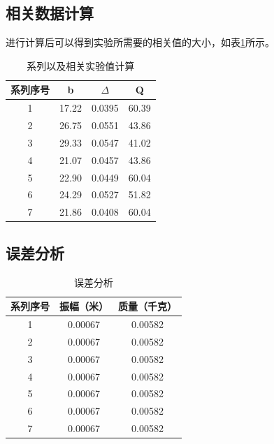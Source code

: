 \documentclass{ctexart}
\begin{document}
  \subsection{相关数据计算}
  进行计算后可以得到实验所需要的相关值的大小，如表\ref{jisuan}所示。

  \begin{table}[H]
    \centering   
    \caption{系列以及相关实验值计算}\label{jisuan}
    \begin{tabular}{| c || c || c || c |}
        \hline
        系列序号 & b & $\Delta$ & Q\\
        \hline
        1 & 17.22 & 0.0395 & 60.39\\
        \hline
        2 & 26.75 & 0.0551 & 43.86\\
        \hline
        3 & 29.33 & 0.0547 & 41.02\\
        \hline
        4 & 21.07 & 0.0457 & 43.86\\
        \hline
        5 & 22.90 & 0.0449 & 60.04\\
        \hline   
        6 & 24.29 & 0.0527 & 51.82\\
        \hline
        7 & 21.86 & 0.0408 & 60.04\\
        \hline                             
    \end{tabular}
  \end{table}

  \subsection{误差分析}
  \begin{table}[H]
    \centering   
    \caption{误差分析}
    \begin{tabular}{| c || c || c |}
        \hline
        系列序号 & 振幅（米） & 质量（千克）\\
        \hline
        1 & 0.00067 & 0.00582\\
        \hline
        2 & 0.00067 & 0.00582\\
        \hline
        3 & 0.00067 & 0.00582\\
        \hline
        4 & 0.00067 & 0.00582\\
        \hline
        5 & 0.00067 & 0.00582\\
        \hline   
        6 & 0.00067 & 0.00582\\
        \hline
        7 & 0.00067 & 0.00582\\
        \hline                             
    \end{tabular}
  \end{table}
\newpage
\end{document}
